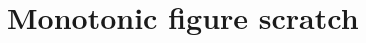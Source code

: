 \documentclass[a4paper,USenglish]{tex/lipics-v2016}
\begin{document}
\begin{mathpar}



\end{mathpar}



\section{Monotonic figure scratch}








\end{document}

